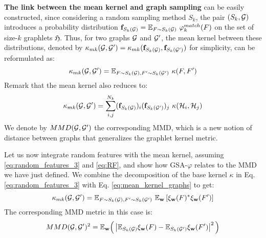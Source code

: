 \textbf{The link between the mean kernel and graph sampling} can be easily constructed, since considering a random sampling method $S_k$, the pair $(S_k , \mathcal{G})$  introduces a probability distribution $\mathbf{f}_{S_k(\mathcal{G})}= \mathbb{E}_{F \sim S_k(\mathcal{G})} ~\varphi^{match}_k(F)$ on the set of size-$k$ graphlets $\mathfrak{H}$. Thus, for two graphs $\mathcal{G}$ and $\mathcal{G}'$, the mean kernel between these distributions, denoted by $\kappa_{mk}(\mathcal{G},\mathcal{G}')=\kappa_{mk}(\mathbf{f}_{S_k(\mathcal{G})},\mathbf{f}_{S_k(\mathcal{G}')})$ for simplicity, can be reformulated as:
\begin{equation}
\label{eq:mean_kernel_graphs}
\kappa_{mk}(\mathcal{G},\mathcal{G}') = \mathbb{E}_{F \sim S_k(\mathcal{G}), F' \sim S_k(\mathcal{G}')} ~\kappa(F,F')
\end{equation}
Remark that the mean kernel also reduces to:
\[
\kappa_{mk}(\mathcal{G},\mathcal{G}')=\sum_{i,j}^{N_k}(\mathbf{f}_{S_k(\mathcal{G})})_i(\mathbf{f}_{S_k(\mathcal{G}')})_j~\kappa(\mathcal{H}_i,\mathcal{H}_j) 
\]
We denote by $MMD(\mathcal{G},\mathcal{G}')$ the corresponding MMD, which is a new notion of distance between graphs that generalizes the graphlet kernel metric.

Let us now integrate random features with the mean kernel, assuming \eqref{eq:random_features_3} and \eqref{eq:RF}, and show how GSA-$\varphi$ relates to the MMD we have just defined. We combine the decomposition of the base kernel $\kappa$ in Eq. \eqref{eq:random_features_3} with Eq. \eqref{eq:mean_kernel_graphs} to get:
\begin{equation}
    \label{eq:mk_rf}
    \kappa_{mk}(\mathcal{G},\mathcal{G}')= \mathbb{E}_{F \sim S_k(\mathcal{G}), F' \sim S_k(\mathcal{G}')}~ \mathbb{E}_\mathbf{w} \left[\xi_\mathbf{w}(F)^*\xi_\mathbf{w}(F')\right]
\end{equation}
The corresponding MMD metric in this case is:
\begin{equation}
\label{eq:MMD-RF}
MMD(\mathcal{G},\mathcal{G}')^2 = \mathbb{E}_{\mathbf{w}} \Big( \left| \mathbb{E}_{S_k(\mathcal{G})} \xi_\mathbf{w}(F) - \mathbb{E}_{S_k(\mathcal{G}')} \xi_\mathbf{w}(F') \right|^2 \Big)
\end{equation}

